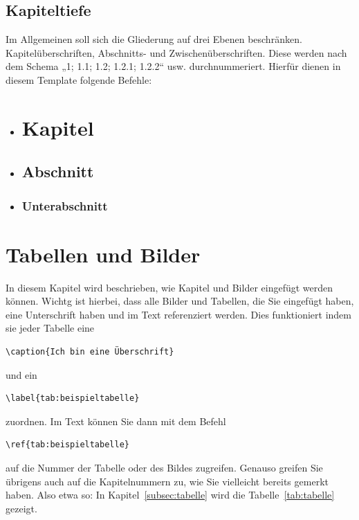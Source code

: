 \documentclass[
     11pt,         %
     a4paper,      %
     oneside,
     ]{article}
\begin{document}
\subsection{Kapiteltiefe}
Im Allgemeinen soll sich die Gliederung auf drei Ebenen beschränken. Kapitelüberschriften, Abschnitts- und Zwischenüberschriften. Diese werden nach
dem Schema „1; 1.1; 1.2; 1.2.1; 1.2.2“ usw. durchnummeriert. Hierfür dienen in diesem Template folgende Befehle:
\begin{itemize}
\item \begin{verbatim*}\section{Kapitel}\end{verbatim*}
\item \begin{verbatim*}\subsection{Abschnitt}\end{verbatim*}
\item \begin{verbatim*}\subsubsection{Unterabschnitt}\end{verbatim*}
\end{itemize}


\section{Tabellen und Bilder}\label{sec:tabellenundbilder}
In diesem Kapitel wird beschrieben, wie Kapitel und Bilder eingefügt werden können. Wichtg ist hierbei, dass alle Bilder und Tabellen, die Sie eingefügt haben, eine Unterschrift haben und im Text referenziert werden. Dies funktioniert indem sie jeder Tabelle eine \begin{verbatim}\caption{Ich bin eine Überschrift}\end{verbatim} und ein \begin{verbatim}\label{tab:beispieltabelle}\end{verbatim} zuordnen. Im Text können Sie dann mit dem Befehl \begin{verbatim}\ref{tab:beispieltabelle}\end{verbatim} auf die Nummer der Tabelle oder des Bildes zugreifen. Genauso greifen Sie übrigens auch auf die Kapitelnummern zu, wie Sie vielleicht bereits gemerkt haben.
Also etwa so: In Kapitel~\ref{subsec:tabelle} wird die Tabelle~\ref{tab:tabelle} gezeigt.
\end{document}
